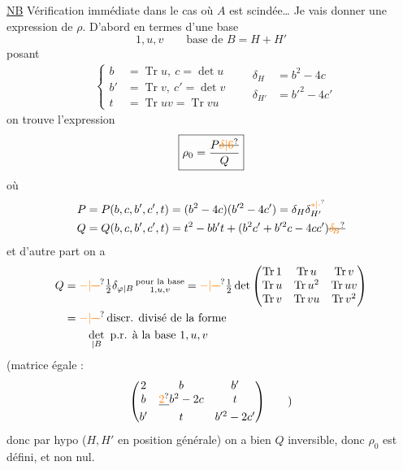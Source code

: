 \uline{NB} Vérification immédiate dans le cas où $A$ est scindée\ldots
Je vais donner une expression de $\rho$. D'abord en termes d'une base
\[
1,u,v\qquad\text{base de } B=H+H'
\]
posant
\[
\begin{aligned}
&\left\{\begin{aligned} b&=\operatorname{Tr}u,\ c=\det u\\ b'&=\operatorname{Tr}v,\ c'=\det v\\ t&=\operatorname{Tr}uv=\operatorname{Tr}vu
\end{aligned}\right. &&
\begin{aligned}\delta_H&=b^2-4c\\ \delta_{H'}&=b'^2-4c'\\ &\end{aligned}
\end{aligned}
\]
on trouve l'expression 
\[
\boxed{\rho_0=\frac{P\deleted{\unsure{\delta|6}}}{Q}}
\]
où
\[
\begin{aligned}
P&=P(b,c,b',c',t)=(b^2-4c)(b'^2-4c')=\delta_H\delta_{H'}^{\unsure{*|\cdot}}\\ Q&=Q(b,c,b',c',t)=t^2-bb't+(b^2c'+b'^2c-4cc')\deleted{\unsure{\delta_{\!B}}}
\end{aligned}
\]
et d'autre part on a
\[
\begin{aligned}
Q&=\unsure{-|{\deleted{-}}}\tfrac12\delta_{\varphi|B}\,\substack{\text{pour la base}\\1,u,v} =\unsure{-|{\deleted{-}}}\tfrac12\det\begin{pmatrix} \operatorname{Tr}1 & \operatorname{Tr}u & \operatorname{Tr}v\\ \operatorname{Tr}u & \operatorname{Tr}u^2 & \operatorname{Tr}uv\\ \operatorname{Tr}v & \operatorname{Tr}vu & \operatorname{Tr}v^2
\end{pmatrix}\\
&=\unsure{-|{\deleted{-}}}\,\text{discr. divisé de la forme}\\ &\qquad\det_{|B}\ \text{p.r. à la base }1,u,v
\end{aligned}
\]
(matrice  égale :
\[
\begin{pmatrix}2&b&b'\\ b&\deleted{\unsure{2}}b^2-2c&t\\ b'&t&b'^2-2c'\end{pmatrix}\qquad)
\]
donc par hypo ($H,H'$ en position générale)  on a bien $Q$ inversible, donc $\rho_0$ est défini, et non nul.


